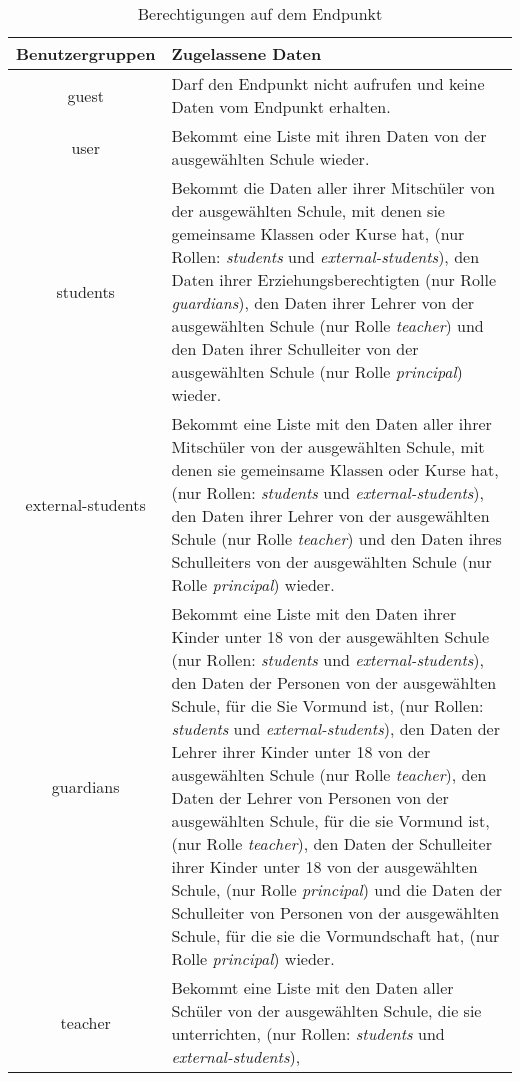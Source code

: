 \begin{longtable}{|c|p{}|}
\caption{Berechtigungen auf dem Endpunkt}
\endfoot
		\caption{Berechtigungen auf dem Endpunkt}
		\label{tab:rest:api:school:users:id:read:right}
\endlastfoot
\hline
\textbf{Benutzergruppen} & \textbf{Zugelassene Daten} \\ \hline
\endhead
guest & Darf den Endpunkt nicht aufrufen und keine Daten vom Endpunkt erhalten. \\ \hline
user & Bekommt eine Liste mit ihren Daten von der ausgewählten Schule wieder. \\ \hline 
students & Bekommt die Daten aller ihrer Mitschüler von der ausgewählten Schule, mit denen sie gemeinsame Klassen oder Kurse hat, (nur Rollen: \textit{students} und \textit{external-students}),
           den Daten ihrer Erziehungsberechtigten (nur Rolle \textit{guardians}), 
					 den Daten ihrer Lehrer von der ausgewählten Schule (nur Rolle \textit{teacher}) und 
					 den Daten ihrer Schulleiter von der ausgewählten Schule (nur Rolle \textit{principal}) wieder.\\ \hline
external-students &  Bekommt eine Liste mit den Daten aller ihrer Mitschüler von der ausgewählten Schule, mit denen sie gemeinsame Klassen oder Kurse hat,  (nur Rollen: \textit{students} und \textit{external-students}),
           den Daten ihrer Lehrer von der ausgewählten Schule (nur Rolle \textit{teacher}) und 
					 den Daten ihres Schulleiters von der ausgewählten Schule (nur Rolle \textit{principal}) wieder.\\ \hline
guardians & Bekommt eine Liste mit den Daten ihrer Kinder unter 18 von der ausgewählten Schule (nur Rollen: \textit{students} und \textit{external-students}), 
					den Daten der Personen von der ausgewählten Schule, für die Sie Vormund ist, (nur Rollen: \textit{students} und \textit{external-students}), 
					den Daten der Lehrer ihrer Kinder unter 18 von der ausgewählten Schule (nur Rolle \textit{teacher}),
					den Daten der Lehrer von Personen von der ausgewählten Schule, für die sie Vormund ist, (nur Rolle \textit{teacher}),
					den Daten der Schulleiter ihrer Kinder unter 18 von der ausgewählten Schule, (nur Rolle \textit{principal}) und
					die Daten der Schulleiter von Personen von der ausgewählten Schule, für die sie die Vormundschaft hat, (nur Rolle \textit{principal})
					wieder.\\ \hline
teacher & Bekommt eine Liste mit den Daten aller Schüler von der ausgewählten Schule, die sie unterrichten, (nur Rollen: \textit{students} und \textit{external-students}),

\end{longtable}
